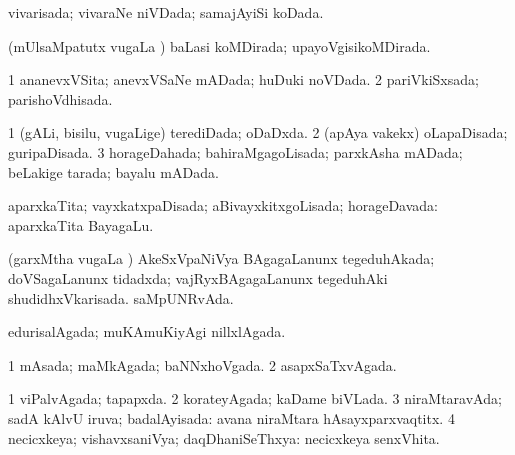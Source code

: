 {\bentry
{} 
\gl{\gu}
\expl{}
\bmng
\emng
\eentry

\bentry
{} 
\gl{\kirxvi}
\expl{}
\bmng
\emng
\eentry

\bentry
{} 
\gl{\gu}
\expl{}
\bmng
 vivarisada; vivaraNe niVDada; samajAyiSi koDada. 
\emng
\eentry

\bentry
{} 
\gl{\gu}
\expl{}
\bmng
 (mUlsaMpatutx \mo vugaLa \vi) baLasi koMDirada; upayoVgisikoMDirada. 
\emng
\eentry

\bentry
{} 
\gl{\gu}
\expl{}
\bmng
\bnum
\num{1} ananevxVSita; anevxVSaNe mADada; huDuki noVDada. 
\num{2} pariVkiSxsada; parishoVdhisada. 
\enum
\emng
\eentry

\bentry
{} 
\gl{\gu}
\expl{}
\bmng
\bnum
\num{1} (gALi, bisilu, \mo vugaLige) terediDada; oDaDxda. 
\num{2} (apAya \mo vakekx) oLapaDisada; guripaDisada. 
\num{3} horageDahada; bahiraMgagoLisada; parxkAsha mADada; beLakige tarada; bayalu mADada. 
\enum
\emng
\eentry

\bentry
{} 
\gl{\gu}
\expl{}
\bmng
 aparxkaTita; vayxkatxpaDisada; aBivayxkitxgoLisada; horageDavada:  aparxkaTita BayagaLu. 
\emng
\eentry

\bentry
{} 
\gl{\gu}
\expl{}
\bmng
 (garxMtha \mo vugaLa \vi) 
\banum
{} AkeSxVpaNiVya BAgagaLanunx tegeduhAkada; doVSagaLanunx tidadxda; vajRyxBAgagaLanunx tegeduhAki shudidhxVkarisada. 
 saMpUNRvAda. 
\eanum
\emng
\eentry

\bentry
{} 
\gl{\gu}
\expl{}
\bmng
 edurisalAgada; muKAmuKiyAgi nillxlAgada. 
\emng
\eentry

\bentry
{} 
\gl{\gu}
\expl{}
\bmng
\bnum
\num{1} mAsada; maMkAgada; baNNxhoVgada. 
\num{2} asapxSaTxvAgada. 
\enum
\emng
\eentry

\bentry
{} 
\gl{\gu}
\expl{}
\bmng
\bnum
\num{1} viPalvAgada; tapapxda. 
\num{2} korateyAgada; kaDame biVLada. 
\num{3} niraMtaravAda; sadA kAlvU iruva; badalAyisada:  avana niraMtara hAsayxparxvaqtitx. 
\num{4} necicxkeya; vishavxsaniVya; daqDhaniSeThxya:  necicxkeya senxVhita. 
\enum
\emng
\eentry

}
